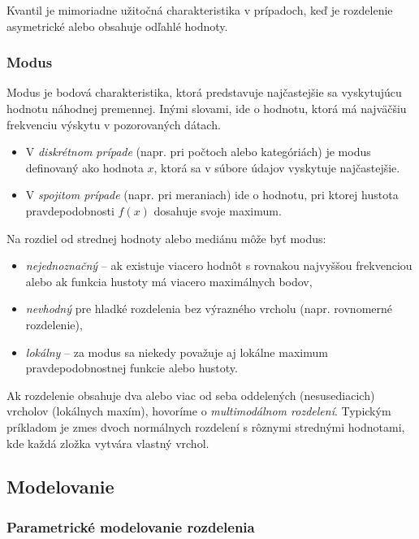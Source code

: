 Kvantil je mimoriadne užitočná charakteristika v prípadoch, keď je rozdelenie asymetrické alebo obsahuje odľahlé hodnoty.

\subsubsection{Modus}\label{subsubsection:modus}

Modus je bodová charakteristika, ktorá predstavuje najčastejšie sa vyskytujúcu hodnotu náhodnej premennej. Inými slovami, ide o hodnotu, ktorá má najväčšiu frekvenciu výskytu v pozorovaných dátach.

\begin{itemize}
  \item V \textit{diskrétnom prípade} (napr. pri počtoch alebo kategóriách) je modus definovaný ako hodnota $x$, ktorá sa v súbore údajov vyskytuje najčastejšie.
  \item V \textit{spojitom prípade} (napr. pri meraniach) ide o hodnotu, pri ktorej hustota pravdepodobnosti $f(x)$ dosahuje svoje maximum.
\end{itemize}

Na rozdiel od strednej hodnoty alebo mediánu môže byť modus:
\begin{itemize}
  \item \textit{nejednoznačný} – ak existuje viacero hodnôt s rovnakou najvyššou frekvenciou alebo ak funkcia hustoty má viacero maximálnych bodov,
  \item \textit{nevhodný} pre hladké rozdelenia bez výrazného vrcholu (napr. rovnomerné rozdelenie),
  \item \textit{lokálny} – za modus sa niekedy považuje aj lokálne maximum pravdepodobnostnej funkcie alebo hustoty.
\end{itemize}

Ak rozdelenie obsahuje dva alebo viac od seba oddelených (nesusediacich) vrcholov (lokálnych maxím), hovoríme o \textit{multimodálnom rozdelení}. Typickým príkladom je zmes dvoch normálnych rozdelení s rôznymi strednými hodnotami, kde každá zložka vytvára vlastný vrchol.

\subsection{Modelovanie}

\subsubsection{Parametrické modelovanie rozdelenia}\label{subsubsec:parametric_models}


